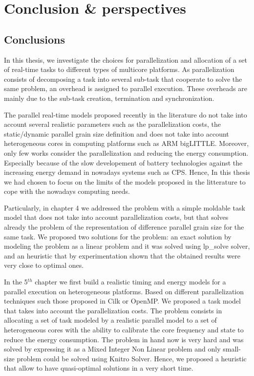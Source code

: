 \chapter*{Conclusion \& perspectives}
\section*{Conclusions}
In this thesis, we investigate the choices for parallelization and
allocation of a set of real-time tasks to different types of multicore
platforms. As parallelization consists of decomposing a task into
several sub-task that cooperate to solve the same problem, an overhead
is assigned to parallel execution. These overheads are mainly due to
the sub-task creation, termination and synchronization.

The parallel real-time models proposed recently in the literature do
not take into account several realistic parameters such as the
parallelization costs, the static/dynamic parallel grain size
definition and does not take into account heterogeneous cores in
computing platforms such as ARM bigLITTLE.  Moreover, only few works
consider the parallelization and reducing the energy
consumption. Especially because of the slow developement of battery
technologies against the increasing energy demand in nowadays systems
such as CPS. Hence, In this thesis we had chosen to focus on the
limits of the models proposed in the litterature to cope with the
nowadays computing needs.

Particularly, in chapter 4 we addressed the problem with a simple
moldable task model that does not take into account parallelization
costs, but that solves already the problem of the representation of
difference parallel grain size for the same task. We proposed two
solutions for the problem: an exact solution by modeling the problem
as a linear problem and it was solved using lp\_solve solver, and an
heuristic that by experimentation shown that the obtained results were
very close to optimal ones.  

In the 5$^{th}$ chapter we first build a realistic timing and energy
models for a parallel execution on heterogeneous platforms. Based on
different parallelization techniques such those proposed in Cilk or
OpenMP. We proposed a task model that takes into account the
parallelization costs. The problem consists in allocating a set of
task modeled by a realistic parallel model to a set of heterogeneous
cores with the ability to calibrate the core frequency and state to
reduce the energy consumption. The problem in hand now is very hard
and was solved by expressing it as a Mixed Integer Non Linear problem
and only small-size problem could be solved using Knitro
Solver. Hence, we proposed a heuristic that allow to have
quasi-optimal solutions in a very short time.

